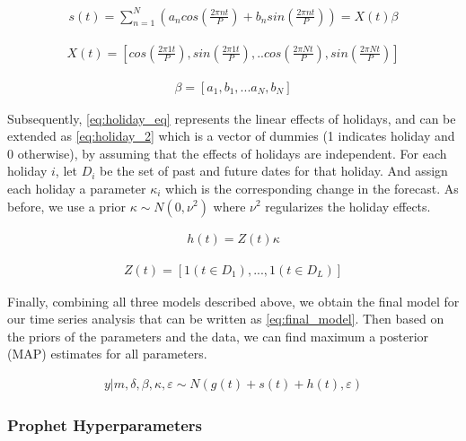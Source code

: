 \begin{align}\label{eq:seasonal_eq}
s(t) = \sum_{n=1}^N \left( a_n cos\left(\frac{2\pi nt}{P}\right) + b_n sin\left( \frac{2\pi nt}{P}  \right)  \right) = X(t)\beta
\end{align}

\begin{align}\label{eq:seasonal_ext}
X(t) = \left[ cos\left(\frac{2\pi1t}{P} \right), sin\left(\frac{2\pi1t}{P}\right),..cos\left(\frac{2\pi Nt}{P} \right), sin\left(\frac{2\pi Nt}{P}\right)  \right]
\end{align}

\begin{align}\label{eq:seasonal_beta}
\beta = [a_1,b_1,...a_N,b_N]
\end{align}

Subsequently, \autoref{eq:holiday_eq} represents the linear effects of holidays, and can be extended as \autoref{eq:holiday_2} which is a vector of dummies (1 indicates holiday and 0 otherwise), by assuming that the effects of holidays are independent. For each holiday $i$, let $D_i$ be the set of past and future dates for that holiday. And assign each holiday a parameter $\kappa_i$ which is the corresponding change in the forecast. As before, we use a prior $\kappa \sim N(0,\nu^2)$ where $\nu^2$ regularizes the holiday effects.

\begin{align}\label{eq:holiday_eq}
h(t)= Z(t)\kappa
\end{align}

\begin{align}\label{eq:holiday_2}
Z(t) = [1(t \in  D_1) ,..., 1(t \in  D_L)] 
\end{align}

Finally, combining all three models described above, we obtain the final model for our time series analysis that can be written as \autoref{eq:final_model}. Then based on the priors of the parameters and the data, we can find maximum a posterior (MAP) estimates for all parameters.

\begin{align}\label{eq:final_model}
y|m,\delta,\beta,\kappa,\varepsilon \sim N(g(t) + s(t) + h(t), \varepsilon)
\end{align}


\subsubsection[Prophet Hyperparameters]{Prophet Hyperparameters}
\label{sec:hyperparameters}

